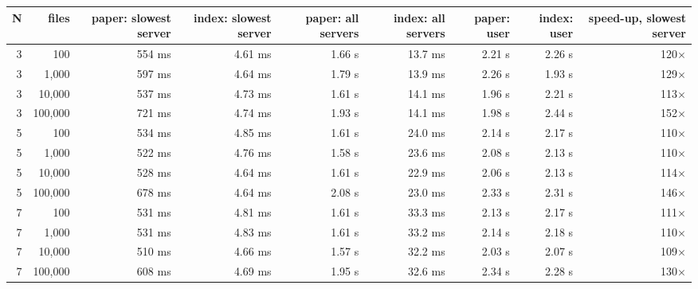 \begin{tabular}{rrrrrrrrr}
\toprule
\textbf{N} & \textbf{files} & \textbf{paper: slowest server} & \textbf{index: slowest server} & \textbf{paper: all servers} & \textbf{index: all servers} & \textbf{paper: user} & \textbf{index: user} & \textbf{speed-up, slowest server} \\
\midrule
3 & 100 & 554 ms & 4.61 ms & 1.66 s & 13.7 ms & 2.21 s & 2.26 s & 120$\times$ \\
3 & 1,000 & 597 ms & 4.64 ms & 1.79 s & 13.9 ms & 2.26 s & 1.93 s & 129$\times$ \\
3 & 10,000 & 537 ms & 4.73 ms & 1.61 s & 14.1 ms & 1.96 s & 2.21 s & 113$\times$ \\
3 & 100,000 & 721 ms & 4.74 ms & 1.93 s & 14.1 ms & 1.98 s & 2.44 s & 152$\times$ \\
5 & 100 & 534 ms & 4.85 ms & 1.61 s & 24.0 ms & 2.14 s & 2.17 s & 110$\times$ \\
5 & 1,000 & 522 ms & 4.76 ms & 1.58 s & 23.6 ms & 2.08 s & 2.13 s & 110$\times$ \\
5 & 10,000 & 528 ms & 4.64 ms & 1.61 s & 22.9 ms & 2.06 s & 2.13 s & 114$\times$ \\
5 & 100,000 & 678 ms & 4.64 ms & 2.08 s & 23.0 ms & 2.33 s & 2.31 s & 146$\times$ \\
7 & 100 & 531 ms & 4.81 ms & 1.61 s & 33.3 ms & 2.13 s & 2.17 s & 111$\times$ \\
7 & 1,000 & 531 ms & 4.83 ms & 1.61 s & 33.2 ms & 2.14 s & 2.18 s & 110$\times$ \\
7 & 10,000 & 510 ms & 4.66 ms & 1.57 s & 32.2 ms & 2.03 s & 2.07 s & 109$\times$ \\
7 & 100,000 & 608 ms & 4.69 ms & 1.95 s & 32.6 ms & 2.34 s & 2.28 s & 130$\times$ \\
\bottomrule
\end{tabular}
